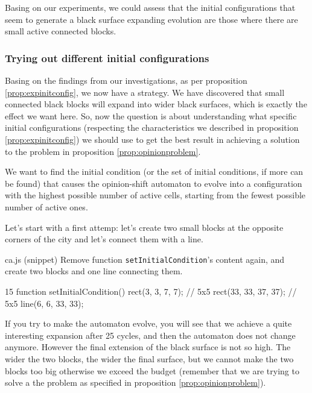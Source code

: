 \begin{proposition}
\label{prop:expinitconfig}
Basing on our experiments, we could assess that the initial configurations that seem to generate
a black surface expanding evolution are those where there are small active connected blocks.
\end{proposition}

\subsubsection{Trying out different initial configurations}
Basing on the findings from our investigations, as per proposition \ref{prop:expinitconfig}, we
now have a strategy. We have discovered that small connected black blocks will expand into wider
black surfaces, which is exactly the effect we want here. So, now the question is about understanding
what specific initial configurations (respecting the characteristics we described in
proposition \ref{prop:expinitconfig}) we should use to get the best result in achieving a solution
to the problem in proposition \ref{prop:opinionproblem}.

\begin{proposition}
\label{prop:simobj}
We want to find the initial condition (or the set of initial conditions, if more can be found)
that causes the opinion-shift automaton to evolve into a configuration with the
highest possible number of active cells, starting from the fewest possible number of active ones.
\end{proposition}

Let's start with a first attemp: let's create two small blocks at the opposite corners of the city
and let's connect them with a line.

\begin{programcode}{ca.js (snippet)}
Remove function \texttt{setInitialCondition}'s content again, and create two blocks and one
line connecting them.
\begin{codeh1}{1}{5}
function setInitialCondition() {
  rect(3, 3, 7, 7); // 5x5
  rect(33, 33, 37, 37); // 5x5
  line(6, 6, 33, 33);
}
\end{codeh1}
\end{programcode}

If you try to make the automaton evolve, you will see that we achieve a quite interesting
expansion after 25 cycles, and then the automaton does not change anymore. However the
final extension of the black surface is not so high. The wider the two blocks, the wider the
final surface, but we cannot make the two blocks too big otherwise we exceed the
budget (remember that we are trying to solve a the problem as specified in proposition
\ref{prop:opinionproblem}).\\

